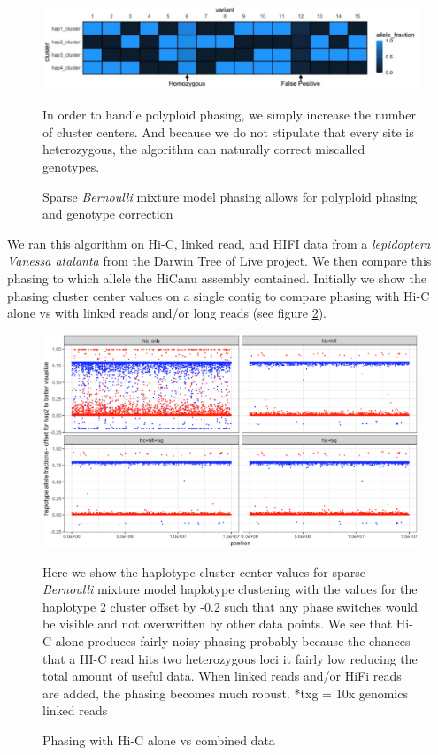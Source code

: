 \begin{figure}[htbp!]
\caption{Sparse \textit{Bernoulli} mixture model phasing allows for polyploid phasing and genotype correction}
\label{figure:bernoulli}
\begin{centering}
\includegraphics[width=\textwidth]{poly.png}
\par{In order to handle polyploid phasing, we simply increase the number of cluster centers. And because we do not stipulate that every site is heterozygous, the algorithm can naturally correct miscalled genotypes.}
\end{centering}
\end{figure}


\par{
We ran this algorithm on Hi-C, linked read, and HIFI data from a \textit{lepidoptera} \textit{Vanessa atalanta} from the Darwin Tree of Live project. We then compare this phasing to which allele the HiCanu assembly 
contained. Initially we show the phasing cluster center values on a single contig to compare phasing with Hi-C alone vs with linked reads and/or long reads (see figure \ref{figure:hicphasing1}).
}

\begin{figure}[htbp!]

\caption{Phasing with Hi-C alone vs combined data}\label{figure:hicphasing1}
\begin{centering}
\includegraphics[width=\textwidth]{hicphasing1.png}
\par{Here we show the haplotype cluster center values for sparse \textit{Bernoulli} mixture model haplotype clustering with the values for the haplotype 2 cluster offset by -0.2 such that any phase switches would be visible and not overwritten by other data points. We see that Hi-C alone produces fairly noisy phasing probably because the chances that a HI-C read hits two heterozygous loci it fairly low reducing the total amount of useful data. When linked reads and/or HiFi reads are added, the phasing becomes much robust. *txg = 10x genomics linked reads}
\end{centering}
\end{figure}



